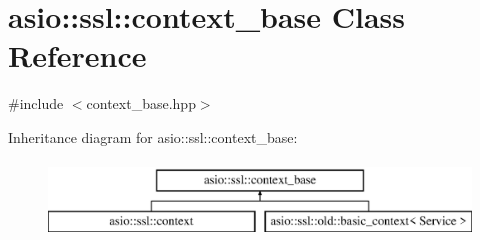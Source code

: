 \hypertarget{classasio_1_1ssl_1_1context__base}{}\section{asio\+:\+:ssl\+:\+:context\+\_\+base Class Reference}
\label{classasio_1_1ssl_1_1context__base}


{\ttfamily \#include $<$context\+\_\+base.\+hpp$>$}

Inheritance diagram for asio\+:\+:ssl\+:\+:context\+\_\+base\+:\begin{figure}[H]
\begin{center}
\leavevmode
\includegraphics[height=2.000000cm]{classasio_1_1ssl_1_1context__base}
\end{center}
\end{figure}
